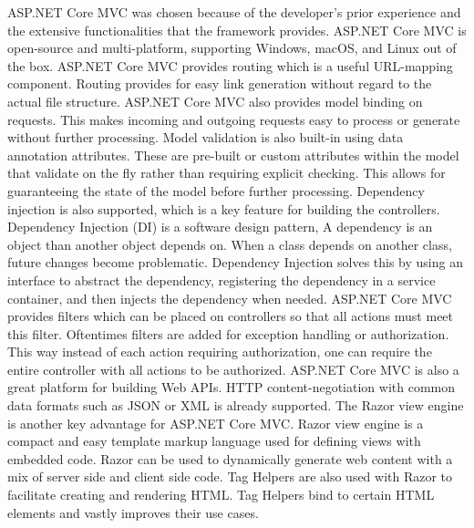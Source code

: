 ASP.NET Core MVC was chosen because of the developer's prior experience and the extensive functionalities that the framework provides. ASP.NET Core MVC is open-source and multi-platform, supporting Windows, macOS, and Linux out of the box. ASP.NET Core MVC provides routing which is a useful URL-mapping component. Routing provides for easy link generation without regard to the actual file structure. ASP.NET Core MVC also provides model   binding on requests. This makes incoming and outgoing requests easy to process or generate without further processing. Model validation is also built-in using data annotation attributes. These are pre-built or custom attributes within the model that validate on the fly rather than requiring explicit checking. This allows for guaranteeing the state of the model before further processing. Dependency injection is also supported, which is a key feature for building the controllers. Dependency Injection (DI) is a software design pattern,  A dependency is an object than another object depends on. When a class depends on another class, future changes become problematic. Dependency Injection solves this by using an interface to abstract the dependency, registering the dependency in a service container, and then injects the dependency when needed. ASP.NET Core MVC provides filters which can be placed on controllers so that all actions must meet this filter. Oftentimes filters are added for exception handling or authorization. This way instead of each action requiring authorization, one can require the entire controller with all actions to be authorized. ASP.NET Core MVC is also a great platform for building Web APIs. HTTP content-negotiation with common data formats such as JSON or XML is already supported. The Razor view engine is another key advantage for ASP.NET Core MVC. Razor view engine is a compact and easy template markup language used for defining views with embedded \C code. Razor can be used to dynamically generate web content with a mix of server side and client side code. Tag Helpers are also used with Razor to facilitate creating and rendering HTML. Tag Helpers bind to certain HTML elements and vastly improves their use cases. 

